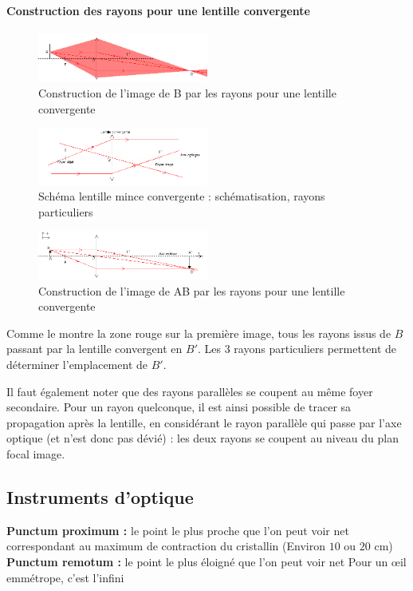 \documentclass[a4paper,11pt]{article}
\begin{document}
\paragraph{Construction des rayons pour une lentille convergente}
\begin{figure}[h]
  \caption{Construction de l'image de B par les rayons pour une lentille convergente}
  \centering
  \includegraphics[width=0.5\textwidth]{Lc7}
\end{figure}
\begin{figure}[h]
  \caption{Schéma lentille mince convergente : schématisation, rayons particuliers}
  \centering
  \includegraphics[width=0.5\textwidth]{Lc4}
\end{figure}
\begin{figure}[h]
  \caption{Construction de l'image de AB par les rayons pour une lentille convergente}
  \centering
  \includegraphics[width=0.5\textwidth]{Lc5}
\end{figure}
Comme le montre la zone rouge sur la première image, tous les rayons issus de $B$ passant par la lentille convergent en $B'$. Les 3 rayons particuliers permettent de déterminer l'emplacement de $B'$.

Il faut également noter que des rayons parallèles se coupent au même foyer secondaire. Pour un rayon quelconque, il est ainsi possible de tracer sa propagation après la lentille, en considérant le rayon parallèle qui passe par l'axe optique (et n'est donc pas dévié) : les deux rayons se coupent au niveau du plan focal image.

\newpage
\subsection{Instruments d'optique}
\begin{defi}
\textbf{Punctum proximum :} le point le plus proche que l’on peut voir net correspondant
au maximum de contraction du cristallin (Environ $10$ ou $20$ cm)
\\\textbf{Punctum remotum :} le point le plus éloigné que l’on peut voir net
Pour un œil emmétrope, c’est l’infini 
\end{defi}
\end{document}
